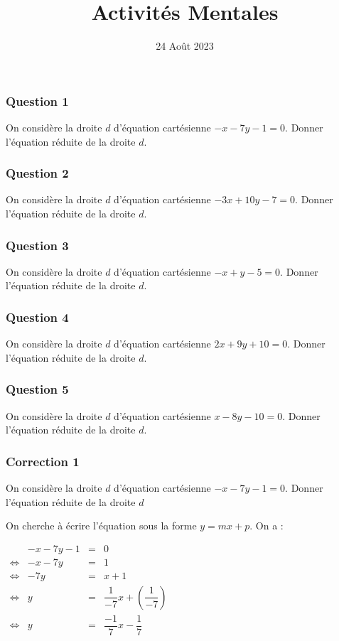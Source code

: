 \documentclass[15pt, mathserif]{beamer}
\title{Activités Mentales}
\date{24 Août 2023}
\begin{document}
\begin{frame}
    \titlepage
\end{frame}

\begin{frame} 
	\frametitle{Question 1}
On considère la droite $d$ d'équation cartésienne $-x-7y-1=0$. Donner l'équation réduite de la droite $d$.\end{frame}


\begin{frame} 
	\frametitle{Question 2}
On considère la droite $d$ d'équation cartésienne $-3x+10y-7=0$. Donner l'équation réduite de la droite $d$.\end{frame}


\begin{frame} 
	\frametitle{Question 3}
On considère la droite $d$ d'équation cartésienne $-x+y-5=0$. Donner l'équation réduite de la droite $d$.\end{frame}


\begin{frame} 
	\frametitle{Question 4}
On considère la droite $d$ d'équation cartésienne $2x+9y+10=0$. Donner l'équation réduite de la droite $d$.\end{frame}


\begin{frame} 
	\frametitle{Question 5}
On considère la droite $d$ d'équation cartésienne $x-8y-10=0$. Donner l'équation réduite de la droite $d$.\end{frame}


\begin{frame}
\vspace{-10mm}
	\frametitle{Correction 1}
On considère la droite $d$ d'équation cartésienne $-x-7y-1=0$. Donner l'équation réduite de la droite $d$ 
 
  \bigskip 
 
 On cherche à écrire l'équation sous la forme $y=mx+p$. On a : 
 
 \hfil $\begin{array}{crcl} 
 & -x-7y-1&=&0 \\ 
 \Leftrightarrow & -x-7y & =&1\\ 
 \Leftrightarrow & -7y &=&x+1\\ 
 \Leftrightarrow & y &=& \dfrac{1}{-7}x +\left( \dfrac{1}{-7} \right)\\ 
 \Leftrightarrow & y &=&\dfrac{-1}{7}x -\dfrac{1}{7}\end{array}$ 
 
 \end{frame}
\end{document}
